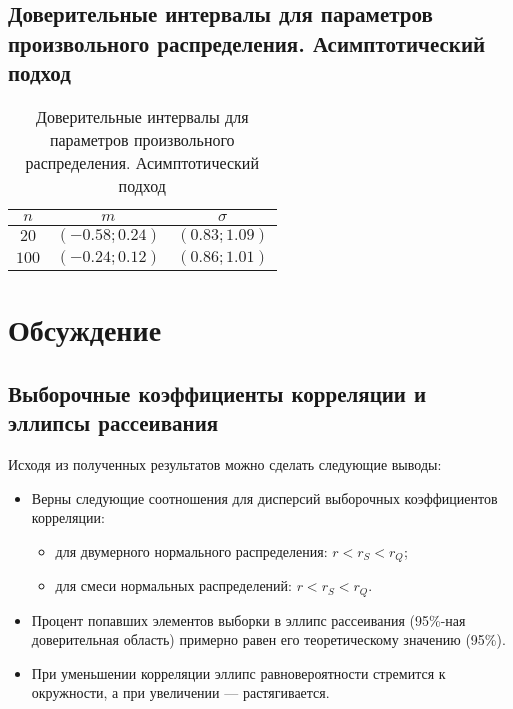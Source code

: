 \documentclass[12pt,a4paper]{article}
\begin{document}
	\subsection{Доверительные интервалы для параметров произвольного распределения. Асимптотический подход}
		\begin{table}[H]
			\begin{center}				
				\begin{tabular}{|c|c|c|}
					\hline
					$n$ & $m$ & $\sigma$\\
					\hline
					$20$ & $(-0.58; 0.24)$ & $(0.83; 1.09)$\\ 
					\hline
					$100$ & $(-0.24; 0.12)$ & $(0.86; 1.01)$\\
					\hline
				\end{tabular}
			\end{center}
			\caption{Доверительные интервалы для параметров произвольного распределения. Асимптотический подход}
		\end{table}
	
\newpage
\section{Обсуждение}
	\subsection{Выборочные коэффициенты корреляции и эллипсы рассеивания}
		Исходя из полученных результатов можно сделать следующие выводы:
		\begin{itemize}
			\item Верны следующие соотношения для дисперсий выборочных коэффициентов корреляции:
			\begin{itemize}
				\item для двумерного нормального распределения: $r < r_S < r_Q$;
				
				\item для смеси нормальных распределений: $r < r_S < r_Q$.
			\end{itemize}
			
			\item Процент попавших элементов выборки в эллипс рассеивания (95\%-ная доверительная область) примерно равен его теоретическому значению (95\%).
			
			\item При уменьшении корреляции эллипс равновероятности стремится к окружности, а при увеличении --- растягивается.
		\end{itemize}
	
\end{document}
